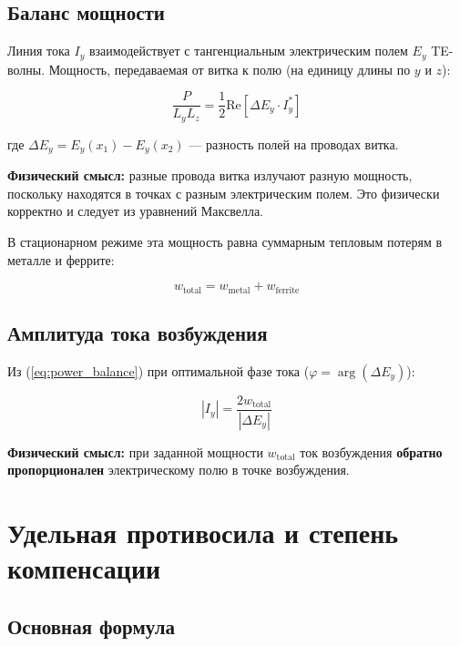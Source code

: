 \documentclass[a4paper,12pt]{article}
\begin{document}
\subsection{Баланс мощности}

Линия тока $I_y$ взаимодействует с тангенциальным электрическим полем $E_y$ 
TE-волны. Мощность, передаваемая от витка к полю (на единицу длины по $y$ и $z$):

\begin{equation}
\frac{P}{L_y L_z} = \frac{1}{2} \text{Re} \left[ \Delta E_y \cdot I_y^* \right]
\label{eq:power_balance}
\end{equation}

где $\Delta E_y = E_y(x_1) - E_y(x_2)$ --- разность полей на проводах витка.

\textbf{Физический смысл:} разные провода витка излучают разную мощность,
поскольку находятся в точках с разным электрическим полем. Это физически
корректно и следует из уравнений Максвелла.

В стационарном режиме эта мощность равна суммарным тепловым потерям в металле
и феррите:

\begin{equation}
w_{\text{total}} = w_{\text{metal}} + w_{\text{ferrite}}
\label{eq:power_losses}
\end{equation}

\subsection{Амплитуда тока возбуждения}

Из (\ref{eq:power_balance}) при оптимальной фазе тока 
($\varphi = \arg(\Delta E_y)$):

\begin{equation}
\boxed{
|I_y| = \frac{2 w_{\text{total}}}{|\Delta E_y|}
}
\label{eq:current_amplitude}
\end{equation}

\textbf{Физический смысл:} при заданной мощности $w_{\text{total}}$ ток
возбуждения \textbf{обратно пропорционален} электрическому полю в точке
возбуждения.

\section{Удельная противосила и степень компенсации}

\subsection{Основная формула}
\end{document}
